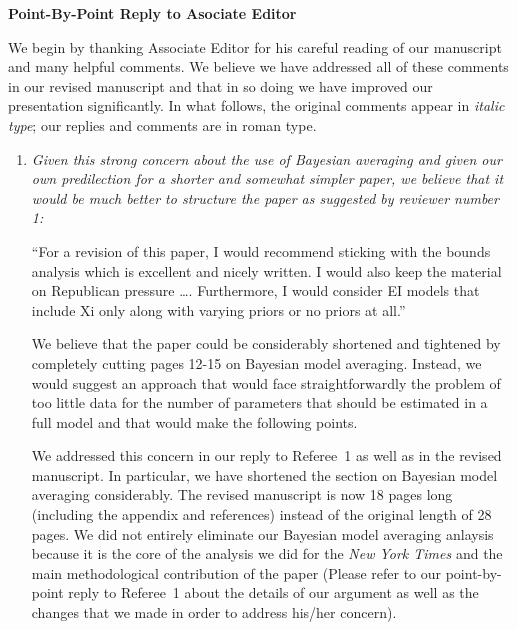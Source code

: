 \documentclass[11pt]{article}
\begin{document}
\begin{center}
  {\bf \Large Point-By-Point Reply to Asociate Editor}
\end{center}

We begin by thanking Associate Editor for his careful reading of our
manuscript and many helpful comments. We believe we have addressed all
of these comments in our revised manuscript and that in so doing we
have improved our presentation significantly.  In what follows, the
original comments appear in \emph{italic type}; our replies and
comments are in roman type.

\bigskip
{}

\begin{enumerate}
  
\item {\it Given this strong concern about the use of Bayesian
    averaging and given our own predilection for a shorter and
    somewhat simpler paper, we believe that it would be much better to
    structure the paper as suggested by reviewer number 1:
    
    ``For a revision of this paper, I would recommend sticking with
    the bounds analysis which is excellent and nicely written.  I
    would also keep the material on Republican pressure \ldots.
    Furthermore, I would consider EI models that include Xi only along
    with varying priors or no priors at all.''
    
    We believe that the paper could be considerably shortened and
    tightened by completely cutting pages 12-15 on Bayesian model
    averaging.  Instead, we would suggest an approach that would face
    straightforwardly the problem of too little data for the number of
    parameters that should be estimated in a full model and that would
    make the following points.}
  
  We addressed this concern in our reply to Referee~1 as well as in
  the revised manuscript.  In particular, we have shortened the
  section on Bayesian model averaging considerably. The revised
  manuscript is now 18 pages long (including the appendix and
  references) instead of the original length of 28 pages. We did not
  entirely eliminate our Bayesian model averaging anlaysis because it
  is the core of the analysis we did for the {\it New York Times} and
  the main methodological contribution of the paper (Please refer to
  our point-by-point reply to Referee~1 about the details of our
  argument as well as the changes that we made in order to address
  his/her concern).
  

\end{enumerate}
\end{document}
